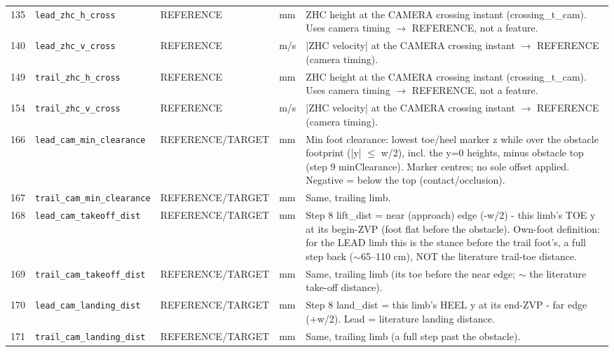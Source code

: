 \begin{longtable}{@{}r p{3.6cm} p{1.55cm} p{1.15cm} p{8.6cm}@{}}
135 & \texttt{lead\_\allowbreak{}zhc\_\allowbreak{}h\_\allowbreak{}cross} & REFERENCE & mm & ZHC height at the CAMERA crossing instant (crossing\_t\_cam). Uses camera timing $\rightarrow$ REFERENCE, not a feature. \\
140 & \texttt{lead\_\allowbreak{}zhc\_\allowbreak{}v\_\allowbreak{}cross} & REFERENCE & m/s & |ZHC velocity| at the CAMERA crossing instant $\rightarrow$ REFERENCE (camera timing). \\
149 & \texttt{trail\_\allowbreak{}zhc\_\allowbreak{}h\_\allowbreak{}cross} & REFERENCE & mm & ZHC height at the CAMERA crossing instant (crossing\_t\_cam). Uses camera timing $\rightarrow$ REFERENCE, not a feature. \\
154 & \texttt{trail\_\allowbreak{}zhc\_\allowbreak{}v\_\allowbreak{}cross} & REFERENCE & m/s & |ZHC velocity| at the CAMERA crossing instant $\rightarrow$ REFERENCE (camera timing). \\
166 & \texttt{lead\_\allowbreak{}cam\_\allowbreak{}min\_\allowbreak{}clearance} & REFERENCE/TARGET & mm & Min foot clearance: lowest toe/heel marker z while over the obstacle footprint (|y| $\leq$ w/2), incl. the y=0 heights, minus obstacle top (step 9 minClearance). Marker centres; no sole offset applied. Negative = below the top (contact/occlusion). \\
167 & \texttt{trail\_\allowbreak{}cam\_\allowbreak{}min\_\allowbreak{}clearance} & REFERENCE/TARGET & mm & Same, trailing limb. \\
168 & \texttt{lead\_\allowbreak{}cam\_\allowbreak{}takeoff\_\allowbreak{}dist} & REFERENCE/TARGET & mm & Step 8 lift\_dist = near (approach) edge (-w/2) - this limb's TOE y at its begin-ZVP (foot flat before the obstacle). Own-foot definition: for the LEAD limb this is the stance before the trail foot's, a full step back ($\sim$65--110 cm), NOT the literature trail-toe distance. \\
169 & \texttt{trail\_\allowbreak{}cam\_\allowbreak{}takeoff\_\allowbreak{}dist} & REFERENCE/TARGET & mm & Same, trailing limb (its toe before the near edge; $\sim$ the literature take-off distance). \\
170 & \texttt{lead\_\allowbreak{}cam\_\allowbreak{}landing\_\allowbreak{}dist} & REFERENCE/TARGET & mm & Step 8 land\_dist = this limb's HEEL y at its end-ZVP - far edge (+w/2). Lead = literature landing distance. \\
171 & \texttt{trail\_\allowbreak{}cam\_\allowbreak{}landing\_\allowbreak{}dist} & REFERENCE/TARGET & mm & Same, trailing limb (a full step past the obstacle). \\

\end{longtable}

